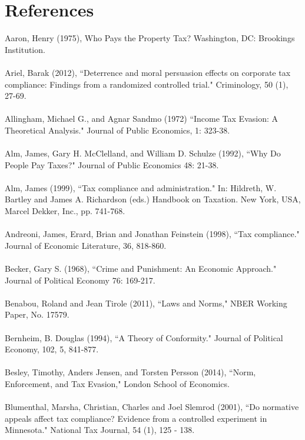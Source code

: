 \documentclass[12pt,titlepage]{article}
\begin{document}
\newpage

\section*{References}

Aaron, Henry (1975), Who Pays the Property Tax? Washington, DC:
Brookings Institution. \\
\\
Ariel, Barak (2012), ``Deterrence and moral persuasion effects on
corporate tax compliance: Findings from a randomized controlled
trial." Criminology, 50 (1), 27-69. \\
\\
Allingham, Michael G., and Agnar Sandmo (1972) ``Income Tax Evasion: A
Theoretical Analysis." Journal of Public Economics, 1: 323-38. \\
\\
Alm, James, Gary H. McClelland, and William D. Schulze (1992), ``Why Do People
Pay Taxes?" Journal of Public Economics 48: 21-38. \\
\\
Alm, James (1999), ``Tax compliance and administration." In: Hildreth,
W. Bartley and James A. Richardson (eds.) Handbook on Taxation. New
York, USA, Marcel Dekker, Inc., pp. 741-768. \\ 
\\
Andreoni, James, Erard, Brian and Jonathan Feinstein (1998), ``Tax
compliance." Journal of Economic Literature, 36, 818-860. \\ 
\\
Becker, Gary S. (1968), ``Crime and Punishment: An Economic Approach."
Journal of Political Economy 76: 169-217.\\
\\
Benabou, Roland and Jean Tirole (2011), ``Laws and Norms," NBER
Working Paper, No. 17579. \\
\\
Bernheim, B. Douglas (1994), ``A Theory of Conformity." Journal of
Political Economy, 102, 5, 841-877. \\
\\
Besley, Timothy, Anders Jensen, and Torsten Persson (2014), ``Norm,
Enforcement, and Tax Evasion," London School of Economics.  \\ 
\\
Blumenthal, Marsha, Christian, Charles and Joel Slemrod (2001), ``Do
normative appeals affect tax compliance? Evidence from a controlled
experiment in Minnesota." National Tax Journal, 54 (1), 125 -
138. \\ 
\end{document}
